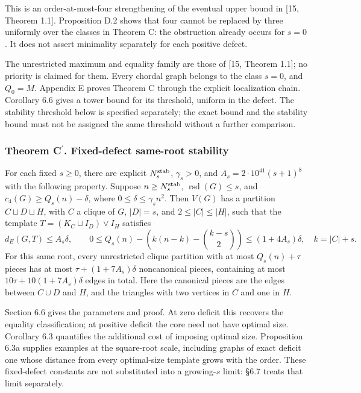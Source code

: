 \documentclass[english,11pt,a4paper]{article}
\begin{document}
This is an order-at-most-four strengthening of the eventual upper bound in {[}15, Theorem 1.1{]}. Proposition D.2 shows that four cannot be replaced by three uniformly over the classes in Theorem C: the obstruction already occurs for \(s=0\). It does not assert minimality separately for each positive defect.

The unrestricted maximum and equality family are those of {[}15, Theorem 1.1{]}; no priority is claimed for them. Every chordal graph belongs to the class \(s=0\), and \(Q_0=M\). Appendix E proves Theorem C through the explicit localization chain. Corollary 6.6 gives a tower bound for its threshold, uniform in the defect. The stability threshold below is specified separately; the exact bound and the stability bound must not be assigned the same threshold without a further comparison.

\subsubsection{Theorem \texorpdfstring{C\ensuremath{^{\prime}}}{C'}. Fixed-defect same-root stability}\label{theorem-c.-fixed-defect-same-root-stability}

For each fixed \(s\ge0\), there are explicit \(N_s^{\rm stab}\), \(\gamma_s>0\), and \(A_s=2\cdot10^{41}(s+1)^8\) with the following property. Suppose \(n\ge N_s^{\rm stab}\), \(\operatorname{rsd}(G)\le s\), and \(c_4(G)\ge Q_s(n)-\delta\), where \(0\le\delta\le\gamma_s n^2\). Then \(V(G)\) has a partition \(C\sqcup D\sqcup H\), with \(C\) a clique of \(G\), \(|D|=s\), and \(2\le |C|\le |H|\), such that the template \(T=(K_C\sqcup I_D)\vee I_H\) satisfies \[
d_E(G,T)\le A_s\delta,\qquad
0\le Q_s(n)-\left(k(n-k)-\binom{k-s}{2}\right)\le(1+4A_s)\delta,
\quad k=|C|+s.
\] For this same root, every unrestricted clique partition with at most \(Q_s(n)+\tau\) pieces has at most \(\tau+(1+7A_s)\delta\) noncanonical pieces, containing at most \(10\tau+10(1+7A_s)\delta\) edges in total. Here the canonical pieces are the edges between \(C\cup D\) and \(H\), and the triangles with two vertices in \(C\) and one in \(H\).

Section 6.6 gives the parameters and proof. At zero deficit this recovers the equality classification; at positive deficit the core need not have optimal size. Corollary 6.3 quantifies the additional cost of imposing optimal size. Proposition 6.3a supplies examples at the square-root scale, including graphs of exact deficit one whose distance from every optimal-size template grows with the order. These fixed-defect constants are not substituted into a growing-\(s\) limit: §6.7 treats that limit separately.
\end{document}
